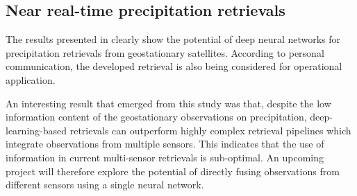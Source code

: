 \subsection{Near real-time precipitation retrievals}

The results presented in \citet{pfreundschuh22b} clearly show the potential of
deep neural networks for precipitation retrievals from geostationary satellites.
According to personal communication, the developed retrieval is also being
considered for operational application.

An interesting result that emerged from this study was that, despite the low
information content of the geostationary observations on precipitation,
deep-learning-based retrievals can outperform highly complex retrieval pipelines
which integrate observations from multiple sensors. This indicates that the use
of information in current multi-sensor retrievals is sub-optimal. An upcoming
project will therefore explore the potential of directly fusing observations
from different sensors using a single neural network.
